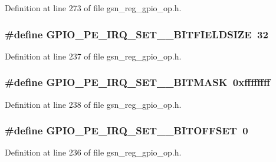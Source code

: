 Definition at line 273 of file gsn\_\-reg\_\-gpio\_\-op.h.

\hypertarget{a00553_a143db6ce2d7512dccbf4758e0f7def9d}{
\subsubsection[{GPIO\_\-PE\_\-IRQ\_\-SET\_\-0\_\-BITFIELDSIZE}]{\setlength{\rightskip}{0pt plus 5cm}\#define GPIO\_\-PE\_\-IRQ\_\-SET\_\_\-BITFIELDSIZE~32}}
\label{a00553_a143db6ce2d7512dccbf4758e0f7def9d}


Definition at line 237 of file gsn\_\-reg\_\-gpio\_\-op.h.

\hypertarget{a00553_ad3ac59b4df23b8f1d42aaeb41cd82ef2}{
\subsubsection[{GPIO\_\-PE\_\-IRQ\_\-SET\_\-0\_\-BITMASK}]{\setlength{\rightskip}{0pt plus 5cm}\#define GPIO\_\-PE\_\-IRQ\_\-SET\_\_\-BITMASK~0xffffffff}}
\label{a00553_ad3ac59b4df23b8f1d42aaeb41cd82ef2}


Definition at line 238 of file gsn\_\-reg\_\-gpio\_\-op.h.

\hypertarget{a00553_ad5ba0d946b7a6cf2e79abae9ef29823e}{
\subsubsection[{GPIO\_\-PE\_\-IRQ\_\-SET\_\-0\_\-BITOFFSET}]{\setlength{\rightskip}{0pt plus 5cm}\#define GPIO\_\-PE\_\-IRQ\_\-SET\_\_\-BITOFFSET~0}}
\label{a00553_ad5ba0d946b7a6cf2e79abae9ef29823e}


Definition at line 236 of file gsn\_\-reg\_\-gpio\_\-op.h.

